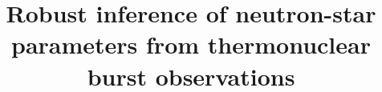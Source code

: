 \documentclass{aastex61}
\begin{document}
\title{Robust inference of neutron-star parameters from thermonuclear burst 
observations}


\end{document}
